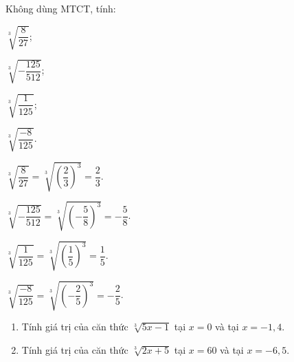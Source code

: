 \begin{vd}%
	Không dùng MTCT, tính:
	\begin{listEX}[4]
	\item $\sqrt[3]{\dfrac{8}{27}}$;
	\item $\sqrt[3]{ - \dfrac{125}{512}}$;
	\item $\sqrt[3]{\dfrac{1}{125}}$;
	\item $\sqrt[3]{\dfrac{-8}{125}}$.
	\end{listEX}
	\loigiai
	{
	\begin{listEX}[2]
	\item $\sqrt[3]{\dfrac{8}{27}}=\sqrt[3]{\left(\dfrac{2}{3}\right)^3}=\dfrac{2}{3}$.
	\item $\sqrt[3]{ - \dfrac{125}{512}}=\sqrt[3]{\left( - \dfrac{5}{8}\right)^3}= - \dfrac{5}{8}$.
	\item $\sqrt[3]{\dfrac{1}{125}}=\sqrt[3]{\left( \dfrac{1}{5}\right)^3}=\dfrac{1}{5}$.
	\item $\sqrt[3]{\dfrac{-8}{125}}=\sqrt[3]{\left(-\dfrac{2}{5}\right)^3}=-\dfrac{2}{5}$.
	\end{listEX}
	}
\end{vd}
\begin{vd}
	\begin{enumerate}
	\item Tính giá trị của căn thức $\sqrt[3]{5x-1}$ tại $x=0$ và tại $x=-1{,}4$.
	\item Tính giá trị của căn thức $\sqrt[3]{2x+5}$ tại $x=60$ và tại $x=-6{,}5$.
	\end{enumerate}
\end{vd}

